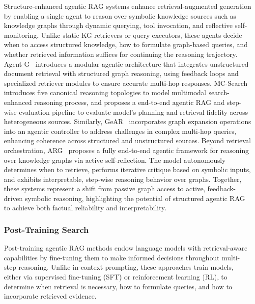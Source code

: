 Structure-enhanced agentic RAG systems enhance retrieval-augmented generation by enabling a single agent to reason over symbolic knowledge sources such as knowledge graphs through dynamic querying, tool invocation, and reflective self-monitoring. Unlike static KG retrievers or query executors, these agents decide when to access structured knowledge, how to formulate graph-based queries, and whether retrieved information suffices for continuing the reasoning trajectory. Agent-G~\cite{leeagent} introduces a modular agentic architecture that integrates unstructured document retrieval with structured graph reasoning, using feedback loops and specialized retriever modules to ensure accurate multi-hop responses. MC-Search~\cite{ning2025mc} introduces five canonical reasoning topologies to model multimodal search-enhanced reasoning process, and proposes a end-to-end agentic RAG and step-wise evaluation pipeline to evaluate model's planning and retrieval fidelity across heterogeneous sources. Similarly, GeAR~\cite{shen2025gear} incorporates graph expansion operations into an agentic controller to address challenges in complex multi-hop queries, enhancing coherence across structured and unstructured sources. Beyond retrieval orchestration, ARG~\cite{zhang2025learning} proposes a fully end-to-end agentic framework for reasoning over knowledge graphs via active self-reflection. The model autonomously determines when to retrieve, performs iterative critique based on symbolic inputs, and exhibits interpretable, step-wise reasoning behavior over graphs. Together, these systems represent a shift from passive graph access to active, feedback-driven symbolic reasoning, highlighting the potential of structured agentic RAG to achieve both factual reliability and interpretability.

\subsubsection{Post-Training Search}
Post-training agentic RAG methods endow language models with retrieval-aware capabilities by fine-tuning them to make informed decisions throughout multi-step reasoning. Unlike in-context prompting, these approaches train models, either via supervised fine-tuning (SFT) or reinforcement learning (RL), to determine when retrieval is necessary, how to formulate queries, and how to incorporate retrieved evidence.

